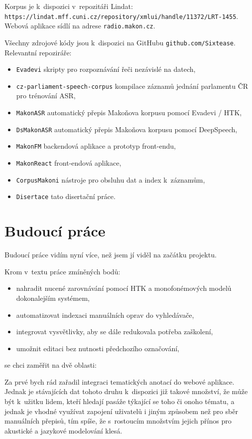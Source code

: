 Korpus je k~dispozici v~repozitáři Lindat:\\
\texttt{https://lindat.mff.cuni.cz/repository/xmlui/handle/11372/LRT-1455}.\\
Webová aplikace sídlí na adrese \texttt{radio.makon.cz}.

Všechny zdrojové kódy jsou k~dispozici na GitHubu \texttt{github.com/Sixtease}.
Relevantní repoziráře:
\begin{itemize}
\item{\texttt{Evadevi} skripty pro rozpoznávání řeči nezávislé na datech,}
\item{\texttt{cz-parliament-speech-corpus}
    kompilace záznamů jednání parlamentu ČR pro trénování ASR,
}
\item{\texttt{MakonASR} automatický přepis Makoňova korpusu pomocí Evadevi / HTK,}
\item{\texttt{DsMakonASR} automatický přepis Makoňova korpusu pomocí DeepSpeech,}
\item{\texttt{MakonFM} backendová aplikace a prototyp front-endu,}
\item{\texttt{MakonReact} front-endová aplikace,}
\item{\texttt{CorpusMakoni} nástroje pro obsluhu dat a index k~záznamům,}
\item{\texttt{Disertace} tato disertační práce.}
\end{itemize}

\section{Budoucí práce}

Budoucí práce vidím nyní více, než jsem jí viděl na začátku projektu.

Krom v~textu práce zmíněných bodů:
\begin{itemize}
\item{nahradit nucené zarovnávání pomocí HTK a monofonémových modelů
dokonalejším systémem,}
\item{automatizovat indexaci manuálních oprav do vyhledávače,}
\item{integrovat vysvětlivky, aby se dále redukovala potřeba zaškolení,}
\item{umožnit editaci bez nutnosti předchozího označování,}
\end{itemize}
se chci zaměřit na dvě oblasti:

Za prvé bych rád zařadil integraci tematických anotací do
webové aplikace. Jednak je stávajících dat tohoto druhu k~dispozici již takové
množství, že může být k~užitku lidem, kteří hledají pasáže týkající se toho či
onoho tématu, a jednak je vhodné využívat zapojení uživatelů i jiným způsobem
než pro sběr manuálních přepisů, tím spíše, že s~rostoucím množstvím jejich
přínos pro akustické a jazykové modelování klesá.

